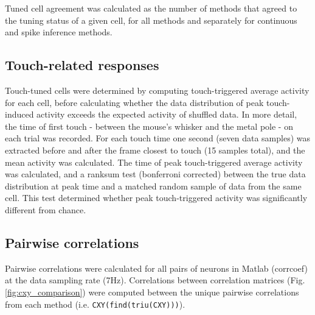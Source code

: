 \documentclass[a4paper,10pt,twocolumn]{article}
\begin{document}
Tuned cell agreement was calculated as the number of methods that agreed to the tuning status of a given cell, for all methods and separately for continuous and spike inference methods.

\subsection{Touch-related responses}
Touch-tuned cells were determined by computing touch-triggered average activity for each cell, before calculating whether the data distribution of peak touch-induced activity exceeds the expected activity of shuffled data. In more detail, the time of first touch - between the mouse's whisker and the metal pole - on each trial was recorded. For each touch time one second (seven data samples) was extracted before and after the frame closest to touch (15 samples total), and the mean activity was calculated. The time of peak touch-triggered average activity was calculated, and a ranksum test (bonferroni corrected) between the true data distribution at peak time and a matched random sample of data from the same cell. This test determined whether peak touch-triggered activity was significantly different from chance. 


\subsection{Pairwise correlations}
Pairwise correlations were calculated for all pairs of neurons in Matlab (corrcoef) at the data sampling rate (7Hz). Correlations between correlation matrices (Fig. \ref{fig:cxy_comparison}) were computed between the unique pairwise correlations from each method (i.e. {\tt CXY(find(triu(CXY)))}).
\end{document}
